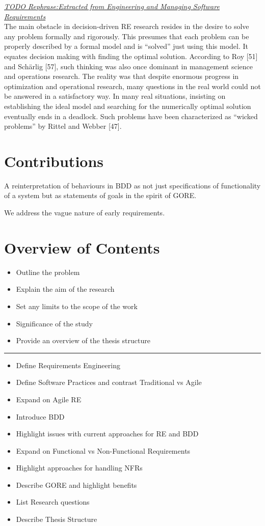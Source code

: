 \documentclass[dissertation]{softeng}
\begin{document}
\underline{\emph{TODO Rephrase:Extracted from Engineering and Managing Software Requirements}}\\
The main obstacle in decision-driven RE research resides in the desire to solve
any problem formally and rigorously. This presumes that each problem can be properly described by a formal model and is “solved” just using this model. It equates decision making with finding the optimal solution. According to Roy [51] and Schärlig [57], such thinking was also once dominant in management science and operations research. The reality was that despite enormous progress in optimization and operational research, many questions in the real world could not be answered
in a satisfactory way. In many real situations, insisting on establishing the ideal model and searching for the numerically optimal solution eventually ends in a deadlock. Such problems have been characterized as “wicked problems” by Rittel and Webber [47].

\section{Contributions}

A reinterpretation of behaviours in BDD as not just specifications of functionality of a system but as statements of goals in the spirit of GORE.

We address the vague nature of early requirements.

\section{Overview of Contents}

\begin{itemize}
\item Outline the problem
\item Explain the aim of the research
\item Set any limits to the scope of the work
\item Significance of the study
\item Provide an overview of the thesis structure
\end{itemize}

\rule{\textwidth}{1pt}

\begin{itemize}
\item Define Requirements Engineering
\item Define Software Practices and contrast Traditional vs Agile
\item Expand on Agile RE
\item Introduce BDD
\item Highlight issues with current approaches for RE and BDD
\item Expand on Functional vs Non-Functional Requirements
\item Highlight approaches for handling NFRs
\item Describe GORE and highlight benefits
\item List Research questions
\item Describe Thesis Structure 
\end{itemize}
\end{document}
